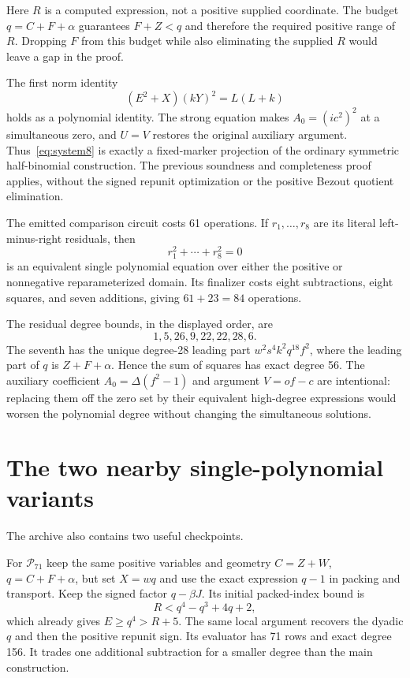 \documentclass[11pt]{article}
\theoremstyle{definition}
\newcommand{\norms}{\mathcal P}
\begin{document}
Here $R$ is a computed expression, not a positive supplied coordinate.
The budget $q=C+F+\alpha$ guarantees $F+Z<q$ and therefore the required
positive range of $R$. Dropping $F$ from this budget while also eliminating
the supplied $R$ would leave a gap in the proof.

The first norm identity
\[
 (E^2+X)(kY)^2=L(L+k)
\]
holds as a polynomial identity. The strong equation makes
$A_0=(ic^2)^2$ at a simultaneous zero, and $U=V$ restores the original
auxiliary argument. Thus~\eqref{eq:system8} is exactly a fixed-marker
projection of the ordinary symmetric half-binomial construction. The
previous soundness and completeness proof applies, without the signed
repunit optimization or the positive Bezout quotient elimination.

The emitted comparison circuit costs 61 operations. If $r_1,\ldots,r_8$
are its literal left-minus-right residuals, then
\begin{equation}\label{eq:sos}
 \boxed{r_1^2+\cdots+r_8^2=0}
\end{equation}
is an equivalent single polynomial equation over either the positive or
nonnegative reparameterized domain. Its finalizer costs eight subtractions,
eight squares, and seven additions, giving $61+23=84$ operations.

The residual degree bounds, in the displayed order, are
\[
 1,5,26,9,22,22,28,6.
\]
The seventh has the unique degree-28 leading part
$w^2s^4k^2q^{18}f^2$, where the leading part of $q$ is
$Z+F+\alpha$. Hence the sum of squares has exact degree 56.
The auxiliary coefficient $A_0=\Delta(f^2-1)$ and argument $V=of-c$
are intentional: replacing them off the zero set by their equivalent
high-degree expressions would worsen the polynomial degree without changing
the simultaneous solutions.

\section{The two nearby single-polynomial variants}

The archive also contains two useful checkpoints.

For $\norms_{71}$ keep the same positive variables and geometry
$C=Z+W$, $q=C+F+\alpha$, but set $X=wq$ and use the exact expression
$q-1$ in packing and transport. Keep the signed factor
$q-\beta J$. Its initial packed-index bound is
\[
 R<q^4-q^3+4q+2,
\]
which already gives $E\geq q^4>R+5$. The same local argument recovers the
dyadic $q$ and then the positive repunit sign. Its evaluator has 71 rows
and exact degree 156. It trades one additional subtraction for a smaller
degree than the main construction.
\end{document}
